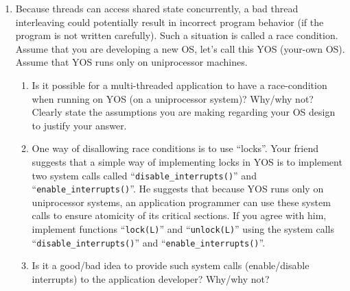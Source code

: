 \begin{enumerate}
\item Because threads can access shared state concurrently, a bad thread interleaving could
potentially result in incorrect program behavior (if the program is not written carefully). Such a
situation is called a race condition. Assume that you are developing a new OS, let’s call this YOS (your-own OS). Assume that YOS runs only on uniprocessor machines.
\begin{enumerate}
\item Is it possible for a multi-threaded application to have a race-condition when running on
YOS (on a uniprocessor system)? Why/why not? Clearly state the assumptions you are
making regarding your OS design to justify your answer.
\item One way of disallowing race conditions is to use “locks”. Your friend
suggests that a
simple way of implementing locks in YOS is to implement two system calls called
“{\tt disable\_interrupts()}” and “{\tt enable\_interrupts()}”. He suggests
that because YOS runs
only on uniprocessor systems, an application programmer can use these system calls to
ensure atomicity of its critical sections. If you agree with him, implement functions
“{\tt lock(L)}” and “{\tt unlock(L)}” using the system calls
“{\tt disable\_interrupts()}” and “{\tt enable\_interrupts()}”. 
\item Is it a good/bad idea to provide such system calls (enable/disable interrupts) to the
application developer? Why/why not?
\end{enumerate}
\end{enumerate}


